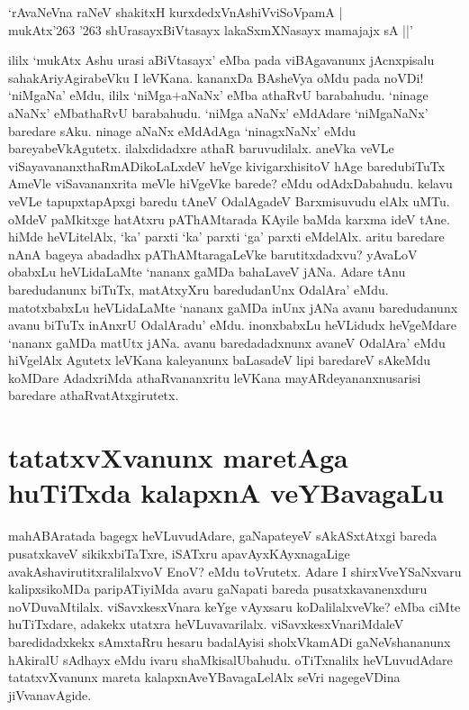 \begin{shloka}
`rAvaNeVna raNeV shakitxH kurxdedxVnAshiVviSoVpamA |\\
mukAtx\char'263 \char'263  shUrasayxBiVtasayx lakaSxmXNasayx mamajajx sA ||'
\end{shloka}
ililx `mukAtx Ashu urasi aBiVtasayx' eMba pada viBAgavanunx jAcnxpisalu sahakAriyAgirabeVku I leVKana. kananxDa BAsheVya oMdu pada noVDi! `niMgaNa' eMdu, ililx  `niMga+aNaNx' eMba athaRvU barabahudu. `ninage aNaNx' eMbathaRvU‌ barabahudu. `niMga aNaNx' eMdAdare `niMgaNaNx' baredare sAku. ninage aNaNx eMdAdAga `ninagxNaNx' eMdu bareyabeVkAgutetx. ilalxdidadxre athaR baruvudilalx. aneVka veVLe viSayavananxthaRmADikoLaLxdeV heVge kivigarxhisitoV hAge baredubiTuTx AmeVle viSavananxrita meVle hiVgeVke barede? eMdu odAdxDabahudu. kelavu veVLe tapupxtapApxgi baredu tAneV OdalAgadeV Barxmisuvudu elAlx uMTu. oMdeV paMkitxge hatAtxru pAThAMtarada KAyile baMda karxma ideV tAne. hiMde heVLitelAlx, `ka' parxti `ka' parxti `ga' parxti eMdelAlx. aritu baredare nAnA bageya abadadhx pAThAMtaragaLeVke barutitxdadxvu? yAvaLoV obabxLu heVLidaLaMte `nananx gaMDa bahaLaveV jANa. Adare tAnu baredudanunx biTuTx, matAtxyXru baredudanUnx OdalAra' eMdu. matotxbabxLu heVLidaLaMte `nananx gaMDa inUnx jANa avanu baredudanunx avanu biTuTx inAnxrU OdalAradu' eMdu. inonxbabxLu heVLidudx heVgeMdare `nananx gaMDa matUtx jANa. avanu baredadadxnunx avaneV OdalAra' eMdu hiVgelAlx Agutetx leVKana kaleyanunx baLasadeV lipi baredareV sAkeMdu koMDare AdadxriMda athaRvananxritu leVKana mayARdeyananxnusarisi baredare athaRvatAtxgirutetx.

\section*{tatatxvXvanunx maretAga huTiTxda kalapxnA veYBavagaLu}

mahABAratada bagegx heVLuvudAdare, gaNapateyeV sAkASxtAtxgi bareda pusatxkaveV sikikxbiTaTxre, iSATxru apavAyxKAyxnagaLige avakAshavirutitxralilalxvoV EnoV? eMdu toVrutetx. Adare I shirxVveYSaNxvaru kalipxsikoMDa paripATiyiMda avaru gaNapati bareda pusatxkavanenxduru noVDuvaMtilalx. viSavxkesxVnara keYge vAyxsaru koDalilalxveVke? eMba ciMte huTiTxdare, adakekx utatxra heVLuvavarilalx. viSavxkesxVnariMdaleV baredidadxkekx sAmxtaRru hesaru badalAyisi sholxVkamADi gaNeVshananunx hAkiralU sAdhayx eMdu ivaru shaMkisalUbahudu. oTiTxnalilx heVLuvudAdare tatatxvXvanunx mareta kalapxnAveYBavagaLelAlx seVri nagegeVDina jiVvanavAgide.

